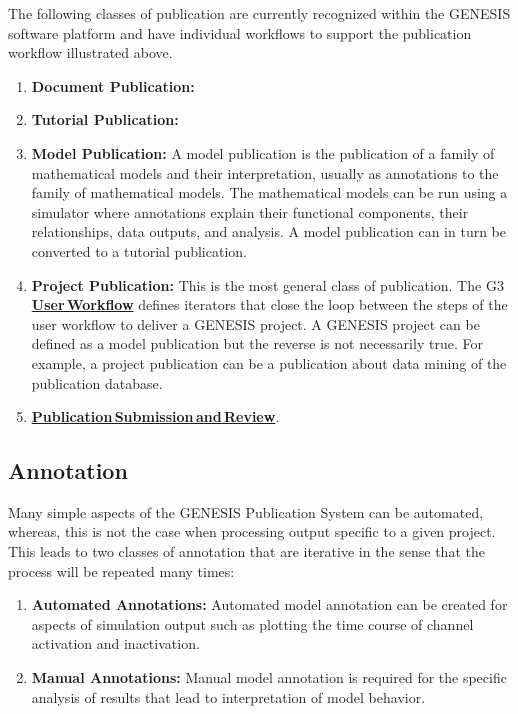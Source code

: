 \documentclass[12pt]{article}
\begin{document}
The following classes of publication are currently recognized within the GENESIS software platform and have individual workflows to support the publication workflow illustrated above.

\begin{enumerate}
   \item {\bf Document Publication:}
   \item {\bf Tutorial Publication:}
   \item {\bf Model Publication:} A model publication is the publication of a family of mathematical models and their interpretation, usually as annotations to the family of mathematical models. The mathematical models can be run using a simulator where annotations explain their functional components, their relationships, data outputs, and analysis. A model publication can in turn be converted to a tutorial publication.
   \item{\bf Project Publication:} This is the most general class of publication. The G3 \href{../workflow-user/workflow-user.tex}{\bf User\,Workflow} defines iterators that close the loop between the steps of the user workflow to deliver a GENESIS project. A GENESIS project can be defined as  a model publication but the reverse is not necessarily true. For example, a project publication can be a publication about data mining of the publication database.
   \item \href{../publication-review/publication-review.tex}{\bf Publication\,Submission\,and\,Review}.
\end{enumerate}

\subsection*{Annotation}

Many simple aspects of the GENESIS Publication System can be automated, whereas, this is not the case when processing output specific to a given project. This leads to two classes of annotation that are iterative in the sense that the process will be repeated many times:

\begin{enumerate}
   \item {\bf Automated Annotations:} Automated model annotation can be created for aspects of simulation output such as plotting the time course of channel activation and inactivation.
   \item {\bf Manual Annotations:} Manual model annotation is required for the specific analysis of results that lead to interpretation of model behavior.
\end{enumerate}
\end{document}
